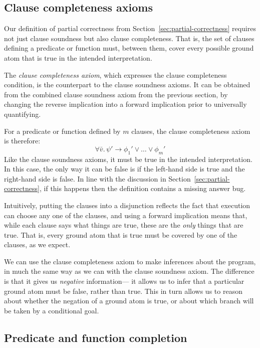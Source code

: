 \subsection{Clause completeness axioms}
\label{sec:ax-clause-completeness}

Our definition of partial correctness
from Section~\ref{sec:partial-correctness}
requires not just clause soundness
but also clause completeness.
That is,
the set of clauses defining a predicate or function
must, between them, cover every possible ground atom
that is true in the intended interpretation.

The \emph{clause completeness axiom},
which expresses the clause completeness condition,
is the counterpart to the clause soundness axioms.
It can be obtained from
the combined clause soundness axiom from the previous section,
by changing the reverse implication
into a forward implication
prior to universally quantifying.

For a predicate or function defined by $m$ clauses,
the clause completeness axiom is therefore:
\[
    \forall \bar{v}.\, \psi' \rightarrow \phi_1' \lor \ldots \lor \phi_m'
\]
Like the clause soundness axioms,
it must be true in the intended interpretation.
In this case,
the only way it can be false is if the left-hand side is true
and the right-hand side is false.
In line with the discussion in Section~\ref{sec:partial-correctness},
if this happens then the definition contains a missing answer bug.

Intuitively,
putting the clauses into a disjunction
reflects the fact that execution can choose any one of the clauses,
and using a forward implication means that,
while each clause says what things are true,
these are the \emph{only} things that are true.
That is, every ground atom that is true
must be covered by one of the clauses,
as we expect.

We can use the clause completeness axiom
to make inferences about the program,
in much the same way as
we can with the clause soundness axiom.
The difference is that
it gives us \emph{negative} information---%
it allows us to infer that a particular ground atom must be false,
rather than true.
This in turn allows us to reason about
whether the negation of a ground atom is true,
or about which branch will be taken by a conditional goal.


\subsection{Predicate and function completion}
\label{sec:completion}


